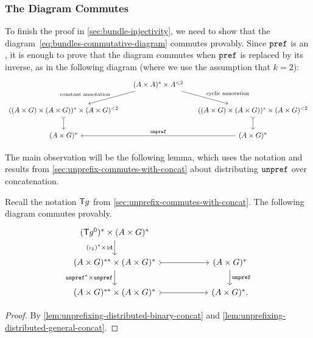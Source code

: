 \subsubsection{The Diagram Commutes}
\label{sec:bundle-diagram-commutes}
To finish the proof in \cref{sec:bundle-injectivity}, we need to show that the diagram~\eqref{eq:bundles-commutative-diagram} commutes provably.  Since $\mathtt{pref}$ is an , it is enough to prove that the diagram commutes when $\mathtt{pref}$ is replaced by its inverse, as in the following diagram (where we use the assumption that $k=2$):
\begin{equation}\label{eq:bundles-commutative-diagram-inverse}
    \begin{tikzcd}[column sep=small]
        & (A \times A)^* \times A^{<2}
        \ar[dl,"\text{constant annotation}"']
        \ar[dr,"\text{cyclic annotation}"]
        \\
        ((A \times G) \times (A \times G))^* \times (A \times G)^{<2}
        \ar[d,\concar]
        & &
        ((A \times G) \times (A \times G))^* \times (A \times G)^{<2}
        \ar[d,\concar] \\
        (A \times G)^*
        & &
        (A \times G)^*
        \ar[ll,"\unprefterm"']
    \end{tikzcd}
\end{equation}



The main observation will be the following lemma, which uses the notation and  results from \cref{sec:unprefix-commutes-with-concat} about distributing $\mathtt{unpref}$ over concatenation.

\begin{lemma}\label{lem:unpref-commutes-with-concat}
    Recall the notation $\mathsf T g$ from \cref{sec:unprefix-commutes-with-concat}.   The following diagram commutes provably.
    \[
        \begin{tikzcd}[column sep=2cm]
            (\functor g^0)^* \times (A \times G)^*
            \ar[d,"{(\iota_\groupid)^* \times \idterm}"']
            \\
            (A \times G)^{**} \times (A \times G)^{*}
            \ar[r,\concar]
            \ar[d,"\unprefterm^* \times \unprefterm"']
            &
            (A \times G)^{*}
            \ar[d,"\unprefterm"]
            \\
            (A \times G)^{**} \times (A \times G)^{*}
            \ar[r,\concar]
            &
            (A \times G)^*.
        \end{tikzcd}
    \]
\end{lemma}
\begin{proof}
    By \cref{lem:unprefixing-distributed-binary-concat} and \cref{lem:unprefixing-distributed-general-concat}.
\end{proof}

